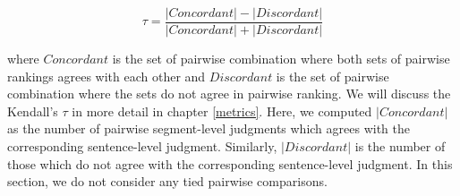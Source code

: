 \begin{equation*}
  \tau = \frac{|Concordant| - |Discordant|}{|Concordant| + |Discordant|}
\end{equation*}

\noindent where $Concordant$ is the set of pairwise combination where both sets
of pairwise rankings agrees with each other and $Discordant$ is the set of
pairwise combination where the sets do not agree in pairwise ranking.  We will
discuss the Kendall's $\tau$ in more detail in chapter \ref{metrics}. Here, we
computed $|Concordant|$ as the number of pairwise segment-level judgments which
agrees with the corresponding sentence-level judgment. Similarly,
$|Discordant|$ is the number of those which do not agree with the corresponding
sentence-level judgment. In this section, we do not consider any tied pairwise
comparisons.


